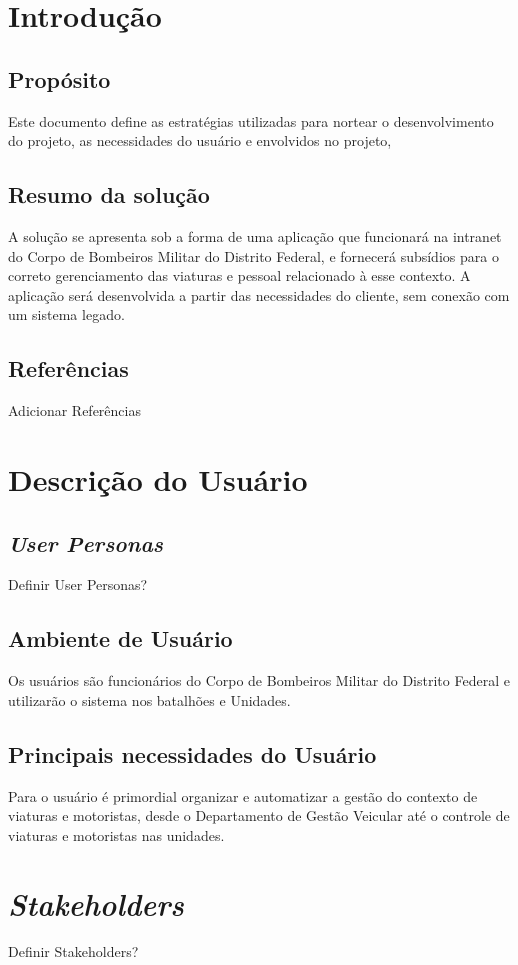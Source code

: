 \begin{apendicesenv}
	\section{Introdução}
		\subsection{Propósito}
Este documento define as estratégias utilizadas para nortear o desenvolvimento do projeto, as necessidades do usuário e envolvidos no projeto,
		\subsection{Resumo da solução}
A solução se apresenta sob a forma de uma aplicação que funcionará na intranet do Corpo de Bombeiros Militar do Distrito Federal, e fornecerá subsídios para o correto gerenciamento das viaturas e pessoal relacionado à esse contexto. A aplicação será desenvolvida a partir das necessidades do cliente, sem conexão com um sistema legado.
		\subsection{Referências}
Adicionar Referências
	\section{Descrição do Usuário}
		\subsection{\textit{User Personas}}
Definir User Personas?
		\subsection{Ambiente de Usuário}
Os usuários são funcionários do Corpo de Bombeiros Militar do Distrito Federal e utilizarão o sistema nos batalhões e Unidades.
		\subsection{Principais necessidades do Usuário}
Para o usuário é primordial organizar e automatizar a gestão do contexto de viaturas e motoristas, desde o Departamento de Gestão Veicular até o controle de viaturas e motoristas nas unidades.
	\section{\textit{Stakeholders}}
Definir Stakeholders?

\end{apendicesenv}
